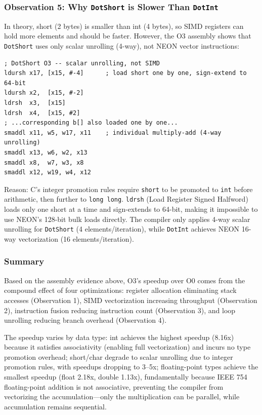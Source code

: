 \documentclass[12pt,a4paper]{article}
\begin{document}
\subsubsection{Observation 5: Why \texttt{DotShort} is Slower Than \texttt{DotInt}}

In theory, short (2 bytes) is smaller than int (4 bytes), so SIMD registers can hold more elements and should be faster. However, the O3 assembly shows that \texttt{DotShort} uses only scalar unrolling (4-way), not NEON vector instructions:

\begin{lstlisting}
; DotShort O3 -- scalar unrolling, not SIMD
ldursh x17, [x15, #-4]      ; load short one by one, sign-extend to 64-bit
ldursh x2,  [x15, #-2]
ldrsh  x3,  [x15]
ldrsh  x4,  [x15, #2]
; ...corresponding b[] also loaded one by one...
smaddl x11, w5, w17, x11    ; individual multiply-add (4-way unrolling)
smaddl x13, w6, w2, x13
smaddl x8,  w7, w3, x8
smaddl x12, w19, w4, x12
\end{lstlisting}

Reason: C's integer promotion rules require \texttt{short} to be promoted to \texttt{int} before arithmetic, then further to \texttt{long long}. \texttt{ldrsh} (Load Register Signed Halfword) loads only one short at a time and sign-extends to 64-bit, making it impossible to use NEON's 128-bit bulk loads directly. The compiler only applies 4-way scalar unrolling for \texttt{DotShort} (4 elements/iteration), while \texttt{DotInt} achieves NEON 16-way vectorization (16 elements/iteration).

\subsubsection{Summary}

Based on the assembly evidence above, O3's speedup over O0 comes from the compound effect of four optimizations: register allocation eliminating stack accesses (Observation 1), SIMD vectorization increasing throughput (Observation 2), instruction fusion reducing instruction count (Observation 3), and loop unrolling reducing branch overhead (Observation 4).

The speedup varies by data type: int achieves the highest speedup (8.16x) because it satisfies associativity (enabling full vectorization) and incurs no type promotion overhead; short/char degrade to scalar unrolling due to integer promotion rules, with speedups dropping to 3--5x; floating-point types achieve the smallest speedup (float 2.18x, double 1.13x), fundamentally because IEEE 754 floating-point addition is not associative, preventing the compiler from vectorizing the accumulation---only the multiplication can be parallel, while accumulation remains sequential.
\end{document}
